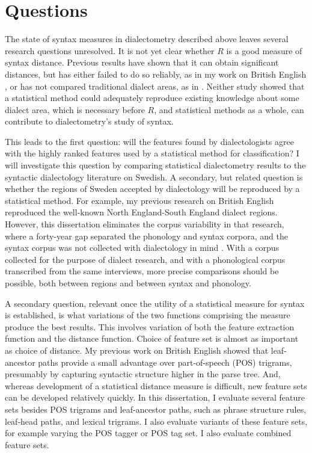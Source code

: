\chapter{Questions}
\label{questions-chapter}

The state of syntax measures in dialectometry described above leaves
several research questions unresolved. It is not yet clear whether $R$
is a good measure of syntax distance. Previous results have shown that
it can obtain significant distances, but has either failed to do so
reliably, as in my work on British English \cite{sanders08b}, or has
not compared traditional dialect areas, as in
. Neither study showed that a statistical method
could adequately reproduce existing knowledge about some dialect area,
which is necessary before $R$, and statistical methods as a whole, can
contribute to dialectometry's study of syntax.

This leads to the first question: will the features found by
dialectologists agree with the highly ranked features used by a
statistical method for classification? I will investigate this
question by comparing statistical dialectometry results to the
syntactic dialectology literature on Swedish. A secondary, but related
question is whether the regions of Sweden accepted by dialectology
will be reproduced by a statistical method. For example, my previous
research on British English reproduced the well-known North
England-South England dialect regions. However, this dissertation
eliminates the corpus variability in that research, where a forty-year
gap separated the phonology and syntax corpora, and the syntax corpus
was not collected with dialectology in mind \cite{sanders08b}. With a
corpus collected for the purpose of dialect research, and with a
phonological corpus transcribed from the same interviews, more precise
comparisons should be possible, both between regions and between
syntax and phonology.

A secondary question, relevant once the utility of a statistical
measure for syntax is established, is what variations of the two
functions comprising the measure produce the best results. This
involves variation of both the feature extraction function and the
distance function. Choice of feature set is almost as important as
choice of distance. My previous work on British English showed
that leaf-ancestor paths provide a small advantage over part-of-speech
(POS) trigrams, presumably by capturing syntactic structure higher in
the parse tree. And, whereas development of a statistical distance
measure is difficult, new feature sets can be developed relatively
quickly.
In this dissertation, I evaluate several feature sets besides POS trigrams and
leaf-ancestor paths, such as phrase structure rules, leaf-head paths,
and lexical trigrams. I also evaluate variants of these feature sets,
for example varying the POS tagger or POS tag set. I also evaluate
combined feature sets.

